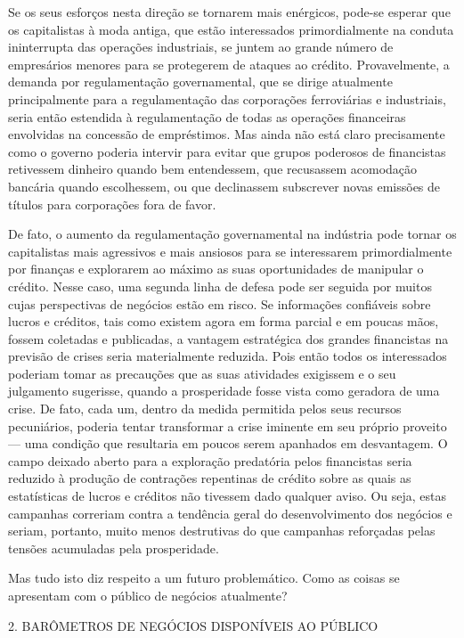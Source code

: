 \documentclass[12pt]{article}
\begin{document}
Se os seus esforços nesta direção se tornarem mais enérgicos, pode-se esperar que os capitalistas à moda antiga, que estão interessados primordialmente na conduta ininterrupta das operações industriais, se juntem ao grande número de empresários menores para se protegerem de ataques ao crédito. Provavelmente, a demanda por regulamentação governamental, que se dirige atualmente principalmente para a regulamentação das corporações ferroviárias e industriais, seria então estendida à regulamentação de todas as operações financeiras envolvidas na concessão de empréstimos. Mas ainda não está claro precisamente como o governo poderia intervir para evitar que grupos poderosos de financistas retivessem dinheiro quando bem entendessem, que recusassem acomodação bancária quando escolhessem, ou que declinassem subscrever novas emissões de títulos para corporações fora de favor.

De fato, o aumento da regulamentação governamental na indústria pode tornar os capitalistas mais agressivos e mais ansiosos para se interessarem primordialmente por finanças e explorarem ao máximo as suas oportunidades de manipular o crédito. Nesse caso, uma segunda linha de defesa pode ser seguida por muitos cujas perspectivas de negócios estão em risco. Se informações confiáveis sobre lucros e créditos, tais como existem agora em forma parcial e em poucas mãos, fossem coletadas e publicadas, a vantagem estratégica dos grandes financistas na previsão de crises seria materialmente reduzida. Pois então todos os interessados poderiam tomar as precauções que as suas atividades exigissem e o seu julgamento sugerisse, quando a prosperidade fosse vista como geradora de uma crise. De fato, cada um, dentro da medida permitida pelos seus recursos pecuniários, poderia tentar transformar a crise iminente em seu próprio proveito — uma condição que resultaria em poucos serem apanhados em desvantagem. O campo deixado aberto para a exploração predatória pelos financistas seria reduzido à produção de contrações repentinas de crédito sobre as quais as estatísticas de lucros e créditos não tivessem dado qualquer aviso. Ou seja, estas campanhas correriam contra a tendência geral do desenvolvimento dos negócios e seriam, portanto, muito menos destrutivas do que campanhas reforçadas pelas tensões acumuladas pela prosperidade.

Mas tudo isto diz respeito a um futuro problemático. Como as coisas se apresentam com o público de negócios atualmente?

2. BARÔMETROS DE NEGÓCIOS DISPONÍVEIS AO PÚBLICO
\end{document}
